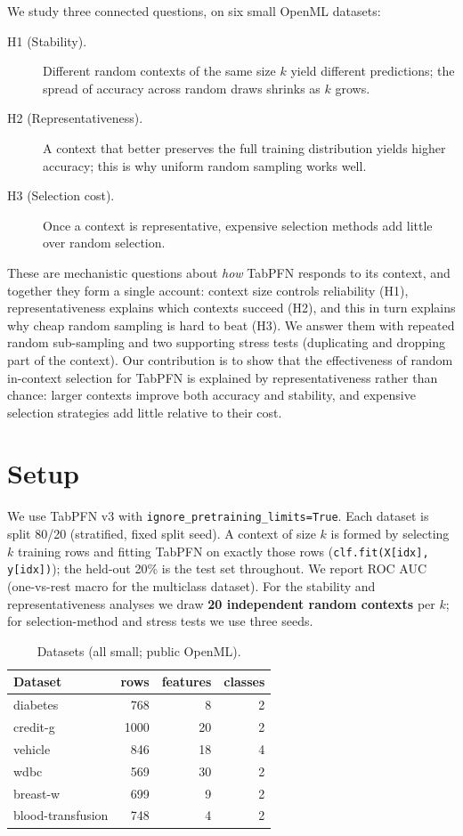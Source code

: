 \documentclass[11pt,a4paper]{article}
\begin{document}
We study three connected questions, on six small OpenML datasets:

\begin{description}
\item[H1 (Stability).] Different random contexts of the same size $k$ yield
different predictions; the spread of accuracy across random draws shrinks as $k$
grows.
\item[H2 (Representativeness).] A context that better preserves the full
training distribution yields higher accuracy; this is why uniform random
sampling works well.
\item[H3 (Selection cost).] Once a context is representative, expensive
selection methods add little over random selection.
\end{description}

These are mechanistic questions about \emph{how} TabPFN responds to its context,
and together they form a single account: context size controls reliability (H1),
representativeness explains which contexts succeed (H2), and this in turn
explains why cheap random sampling is hard to beat (H3). We answer them with
repeated random sub-sampling and two supporting stress tests (duplicating and
dropping part of the context). Our contribution is to show that the
effectiveness of random in-context selection for TabPFN is explained by
representativeness rather than chance: larger contexts improve both accuracy and
stability, and expensive selection strategies add little relative to their cost.

\section{Setup}

We use TabPFN v3 with \texttt{ignore\_pretraining\_limits=True}. Each dataset is
split 80/20 (stratified, fixed split seed). A context of size $k$ is formed by
selecting $k$ training rows and fitting TabPFN on exactly those rows
(\texttt{clf.fit(X[idx], y[idx])}); the held-out 20\% is the test set throughout.
We report ROC AUC (one-vs-rest macro for the multiclass dataset). For the
stability and representativeness analyses we draw \textbf{20 independent random
contexts} per $k$; for selection-method and stress tests we use three seeds.

\begin{table}[h]
\centering
\caption{Datasets (all small; public OpenML).}
\label{tab:datasets}
\begin{tabular}{lrrr}
\toprule
Dataset & rows & features & classes \\
\midrule
diabetes           & 768  & 8  & 2 \\
credit-g           & 1000 & 20 & 2 \\
vehicle            & 846  & 18 & 4 \\
wdbc               & 569  & 30 & 2 \\
breast-w           & 699  & 9  & 2 \\
blood-transfusion  & 748  & 4  & 2 \\
\bottomrule
\end{tabular}
\end{table}
\end{document}
